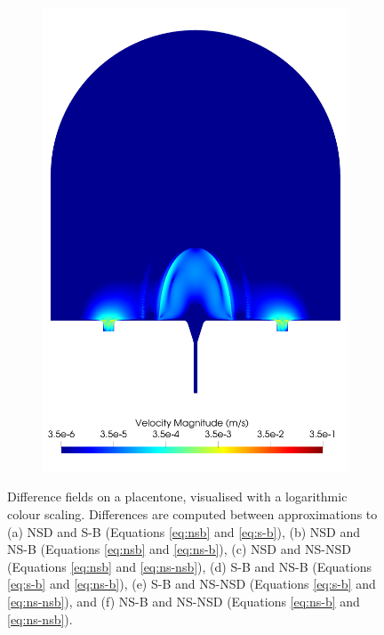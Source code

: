 \begin{figure}
\begin{subfigure}[b]{0.3\textwidth}
            \includegraphics[width=\textwidth]{diagrams/results-modelling/velocity-comparison/meshandsoln_dg_velocity_placentone_23_velocity-log.png}
            \caption{}
            \label{fig:4-models-placentone-norm-log:23}
        \end{subfigure}            

        \caption{Difference fields on a placentone, visualised with a logarithmic colour scaling. Differences are computed between approximations to (a) NSD and S-B (Equations \eqref{eq:nsb} and \eqref{eq:s-b}), (b) NSD and NS-B (Equations \eqref{eq:nsb} and \eqref{eq:ns-b}), (c) NSD and NS-NSD (Equations \eqref{eq:nsb} and \eqref{eq:ns-nsb}), (d) S-B and NS-B (Equations \eqref{eq:s-b} and \eqref{eq:ns-b}), (e) S-B and NS-NSD (Equations \eqref{eq:s-b} and \eqref{eq:ns-nsb}), and (f) NS-B and NS-NSD (Equations \eqref{eq:ns-b} and \eqref{eq:ns-nsb}).}
        \label{fig:4-models-placentone-norm-log}
    \end{figure}

